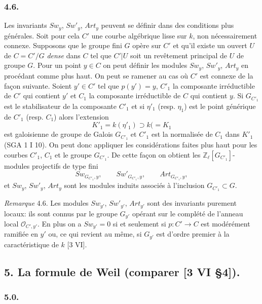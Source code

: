 \subsubsection*{4.6.}

Les
invariants $Sw_y$, $Sw'_y$, $Art_y$ peuvent se définir dans des conditions plus générales. Soit pour cela $C'$ une courbe algébrique lisse sur $k$, non nécessairement connexe. Supposons que le groupe fini $G$ opère sur $C'$ et qu'il existe un ouvert $U$ de $C=C'/G$ \emph{dense} dans $C$ tel que $C'|U$ soit un revêtement principal de $U$ de groupe $G$. Pour un point $y\in C$ on peut définir les modules $Sw_y$, $Sw'_y$, $Art_y$ en procédant comme plus haut. On peut se ramener au cas où $C'$ est connexe de la façon suivante. Soient $y'\in C'$ tel que $p(y')=y$, $C'_1$ la composante irréductible de $C'$ qui contient $y'$ et $C_1$ la composante irréductible de $C$ qui contient $y$. Si $G_{C'_1}$ est le stabilisateur de la composante $C'_1$ et si $\eta'_1$ (resp. $\eta_1$) est le point générique de $C'_1$ (resp. $C_1$) alors l'extension
\[
K'_1=k(\eta'_1)\supset k(=K_1
\]
est galoisienne de groupe de Galois $G_{C'_1}$ et $C'_1$ est la normalisée de $C_1$ dans $K'_1$ (SGA 1 I 10). On peut donc appliquer les considérations faites plus haut pour les courbes $C'_1$, $C_1$ et le groupe $G_{C'_1}$. De cette façon on obtient les $\mathbb{Z}_\ell[G_{C'_1}]$-modules projectifs de type fini
\[
Sw_{G_{C'_1},y},\qquad Sw'_{G_{C'_1},y},\qquad Art_{G_{C'_1},y},
\]
et $Sw_y$, $Sw'_y$, $Art_y$ sont les modules induits associés à l'inclusion $G_{C'_1}\subset G$.

\emph{Remarque} 4.6. Les modules $Sw_{y'}$, $Sw'_{y'}$, $Art_{y'}$ sont des invariants purement locaux: ils sont connus par le groupe $G_{y'}$ opérant sur le complété de l'anneau local $\mathcal{O}_{C',y'}$. En plus on a $Sw_{y'}=0$ si et seulement si $p:C'\to C$ est modérément ramifiée en $y'$ ou, ce qui revient au même, si $G_{y'}$ est d'ordre premier à la caractéristique de $k$ [3 VI].

\subsection*{5. La formule de Weil (comparer [3 VI §4]).}

\subsubsection*{5.0.}

